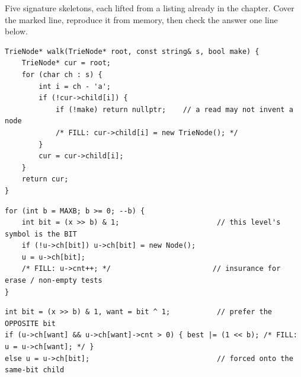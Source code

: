 Five signature skeletons, each lifted from a listing already in the chapter. Cover the marked line,
reproduce it from memory, then check the answer one line below.

\begin{lstlisting}[caption={Drill 1 -- the trie walk, read vs write (from \coderef{c08-trie-ops})}]
TrieNode* walk(TrieNode* root, const string& s, bool make) {
    TrieNode* cur = root;
    for (char ch : s) {
        int i = ch - 'a';
        if (!cur->child[i]) {
            if (!make) return nullptr;    // a read may not invent a node
            /* FILL: cur->child[i] = new TrieNode(); */
        }
        cur = cur->child[i];
    }
    return cur;
}
\end{lstlisting}

\begin{lstlisting}[caption={Drill 2 -- insert bits MSB-first with a count (from \coderef{c08-maxxor})}]
for (int b = MAXB; b >= 0; --b) {
    int bit = (x >> b) & 1;                       // this level's symbol is the BIT
    if (!u->ch[bit]) u->ch[bit] = new Node();
    u = u->ch[bit];
    /* FILL: u->cnt++; */                        // insurance for erase / non-empty tests
}
\end{lstlisting}

\begin{lstlisting}[caption={Drill 3 -- the complement greedy query (from \coderef{c08-maxxor})}]
int bit = (x >> b) & 1, want = bit ^ 1;           // prefer the OPPOSITE bit
if (u->ch[want] && u->ch[want]->cnt > 0) { best |= (1 << b); /* FILL: u = u->ch[want]; */ }
else u = u->ch[bit];                              // forced onto the same-bit child
\end{lstlisting}

